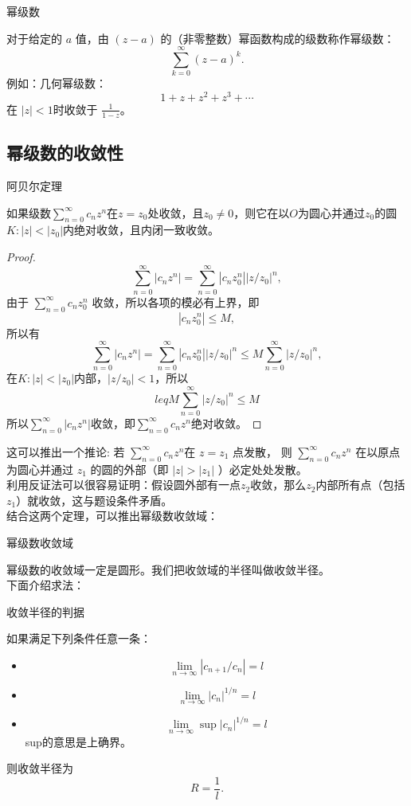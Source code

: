 \documentclass[cn,hazy,blue,14pt,normal]{elegantnote}
\numberwithin{equation}{section}
\begin{document}
\begin{definition}
	幂级数
\end{definition}
对于给定的 $a$ 值，由 $(z-a)$ 的（非零整数）幂函数构成的级数称作幂级数：
$$
\sum^\infty_{k=0} (z-a)^k.
$$
例如：几何幂级数：
$$
1 + z + z^2 + z^3 + \cdots
$$
在 $|z|<1$时收敛于 $\frac{1}{1-z}$。

\subsection{幂级数的收敛性}
\begin{theorem}
	阿贝尔定理
\end{theorem}
如果级数$\sum^\infty_{n=0} c_n z^n$在$z=z_0$处收敛，且$z_0 \neq 0$，则它在以$O$为圆心并通过$z_0$的圆$K: |z|<|z_0|$内绝对收敛，且内闭一致收敛。
\begin{proof}

$$
\sum^\infty_{n=0} |c_n z^n| = \sum^\infty_{n=0} |c_n z^n_0| | z/z_0|^n,
$$
由于 $\sum^\infty_{n=0} c_n z^n_0$ 收敛，所以各项的模必有上界，即
$$
|c_n z^n_0 | \leq M,
$$
所以有
$$
\sum^\infty_{n=0} |c_n z^n| = \sum^\infty_{n=0} |c_n z^n_0| | z/z_0|^n
\leq M \sum^\infty_{n=0} |z/z_0|^n,
$$
在$K: |z|<|z_0|$内部，$|z/z_0|<1$，所以
$$ leq M \sum^\infty_{n=0} |z/z_0|^n \leq M $$
所以$\sum^\infty_{n=0} |c_n z^n|$收敛，即$\sum^\infty_{n=0} c_n z^n$绝对收敛。
\end{proof}

这可以推出一个推论:
若 $\sum^\infty_{n=0} c_n z^n$在 $z=z_1$ 点发散，
则 $\sum^\infty_{n=0} c_n z^n$ 在以原点为圆心并通过 $z_1$ 的圆的外部（即 $|z|>|z_1|$ ）必定处处发散。
\\利用反证法可以很容易证明：假设圆外部有一点$z_2$收敛，那么$z_2$内部所有点（包括$z_1$）就收敛，这与题设条件矛盾。
\\结合这两个定理，可以推出幂级数收敛域：
\begin{theorem}
	幂级数收敛域
\end{theorem}
幂级数的收敛域一定是圆形。我们把收敛域的半径叫做收敛半径。
\\
下面介绍求法：
\begin{theorem}
	收敛半径的判据
\end{theorem}
如果满足下列条件任意一条：
\begin{itemize}
	\item \begin{equation}\label{收敛半径1}\lim\limits_{n \rightarrow \infty} | c_{n+1} / c_n | = l\end{equation}
	\item \begin{equation}\label{收敛半径2}\lim\limits_{n \rightarrow \infty} |c_n|^{1/n} = l\end{equation}
	\item \begin{equation}\label{收敛半径3}\lim\limits_{n \rightarrow \infty} \sup |c_n|^{1/n} = l\end{equation}sup的意思是上确界。
\end{itemize}
则收敛半径为
\begin{equation}
R = \frac{1}{l}.
\end{equation}
\end{document}
